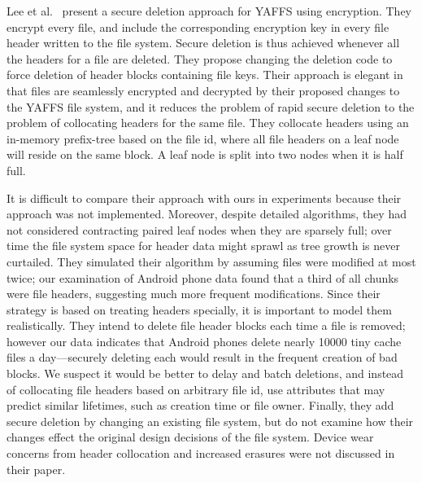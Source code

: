 \documentclass{acmtog}
\begin{document}
Lee et al.~\cite{treeyaffs} present a secure deletion approach for
YAFFS using encryption. They encrypt every file, and include the
corresponding encryption key in every file header written to the file system.
Secure deletion is thus achieved whenever
all the headers for a file are deleted. They propose changing the deletion
code to force deletion of header blocks containing file keys. Their approach
is elegant in that files are seamlessly encrypted and decrypted by their
proposed changes to the YAFFS file system, and it reduces the problem of rapid secure deletion to the
problem of collocating headers for the same file. They collocate headers using an
in-memory prefix-tree based on the file id, where all file headers on a leaf node
will reside on the same block. A leaf node is split into two nodes when it
is half full.

It is difficult to compare their approach with ours in experiments because
their approach was not implemented. Moreover, despite detailed algorithms, they had
not considered contracting paired leaf nodes when they are sparsely full; over
time the file system space for header data might 
sprawl as tree growth is never curtailed.
They simulated their algorithm by assuming files were modified at most twice; our examination of
Android phone data found that a third of all chunks were file headers,
suggesting much more frequent modifications. Since
their strategy is based on treating headers specially, it is important to
model them realistically. They intend to delete file header blocks
each time a file is removed; however our data indicates that Android phones delete
nearly 10000 tiny cache files a day---securely deleting each would result in
the frequent creation of bad blocks.
We suspect it would be better to delay and batch deletions, and instead of
collocating file headers based on arbitrary file id, use attributes
that may predict similar lifetimes, such as creation time or file owner.
Finally, they add secure deletion by changing an existing file
system, but do not examine how their changes effect the original design
decisions of the file system.
Device wear concerns from header collocation and
increased erasures were not discussed in their paper.
\end{document}
